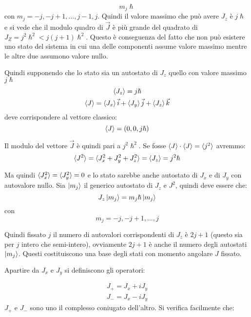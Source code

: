 \begin{equation}
m_j\hslash
\end{equation}
con $m_j=-j,-j+1,\dots,j-1,j$. Quindi il valore massimo che può avere $J_z$ è
$j\hslash$ e si  vede che il modulo quadro di $\vec{J}$ è più grande del
quadrato di $J_Z=j^2\hslash^2<j(j+1)\hslash^2$. Questo è conseguenza del fatto che
non può esistere uno stato del sistema in cui una delle componenti assume valore
massimo mentre le altre due assumono valore nullo.

Quindi supponendo che lo stato sia un autostato di $J_z$ quello con valore
massimo $j\hslash$
\begin{gather}
\braket{J_z}=j\hslash\\
\braket{J}=\braket{J_x}\vec{i}+\braket{J_y}\vec{j}+\braket{J_z}\vec{k}
\end{gather}
deve corrispondere al vettore classico:
\begin{equation}
\braket{J}=(0,0,j\hslash)
\end{equation}

Il modulo del vettore $\vec{J}$ è quindi pari a $j^2\hslash^2$. Se fosse
$\braket{J}\cdot \braket{J}=\braket{j^2}$ avremmo:
\begin{equation}
\braket{J^2}=\braket{J_x^2+J_y^2+J_z^2}=\braket{J_z}=j^2\hslash
\end{equation}

Ma quindi $\braket{J_x^2}=\braket{J_y^2}=0$ e lo stato sarebbe anche autostato
di $J_x$ e di $J_y$ con autovalore nullo.
\breaknote
Sia $\ket{m_j}$ il generico autostato di $J_z$ e $J^2$,
quindi deve essere che:
\begin{equation}
J_z\ket{m_j}=m_j\hslash \ket{m_j}
\end{equation}
con 
\begin{equation}
m_j=-j,-j+1,\dots,j
\end{equation}

Quindi fissato $j$ il numero di autovalori corrispondenti di $J_z$ è $2j+1$
(questo sia per $j$ intero che semi-intero), ovviamente $2j+1$ è anche il numero
degli autostati
$\ket{m_j}$. Questi costituiscono una base degli stati con momento angolare $J$
fissato.

Apartire da $J_x$ e $J_y$ si definiscono gli operatori:

\begin{gather}
J_+ =J_x+iJ_y\\
J_- =J_x-iJ_y
\end{gather}
$J_+$ e $J_-$ sono uno il complesso coniugato dell'altro. Si verifica facilmente
che:

